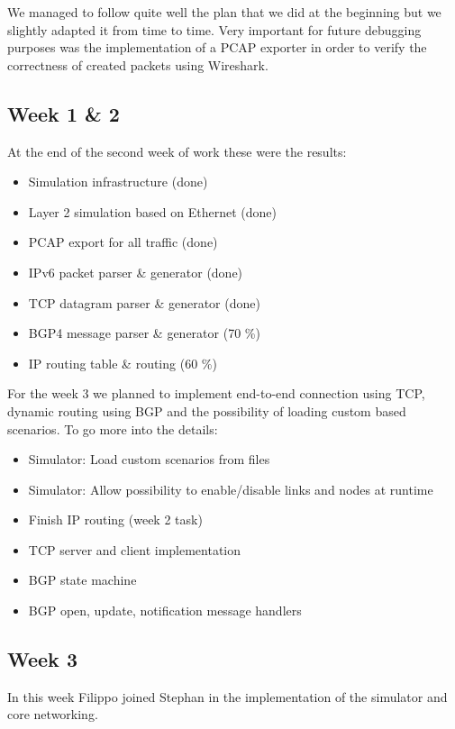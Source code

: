 We managed to follow quite well the plan that we did at the beginning but we slightly
adapted it from time to time. 
Very important for future debugging purposes was the implementation of a PCAP exporter
in order to verify the correctness of created packets using Wireshark.

\subsection{Week 1 \& 2}
At the end of the second week of work these were the results:

\begin{itemize}
    \item Simulation infrastructure (done)
    \item Layer 2 simulation based on Ethernet (done)
    \item PCAP export for all traffic (done)
    \item IPv6 packet parser \& generator (done)
    \item TCP datagram parser \& generator (done)
    \item BGP4 message parser \& generator (70 \%)
    \item IP routing table \& routing (60 \%)
\end{itemize}

For the week 3 we planned to implement end-to-end connection using TCP, dynamic routing
using BGP and the possibility of loading custom based scenarios. 
To go more into the details:

\begin{itemize}
    \item Simulator: Load custom scenarios from files
    \item Simulator: Allow possibility to enable/disable links and nodes at runtime
    \item Finish IP routing (week 2 task)
    \item TCP server and client implementation
    \item BGP state machine
    \item BGP open, update, notification message handlers
\end{itemize}

\subsection{Week 3}
In this week Filippo joined Stephan in the implementation of the simulator and
core networking.

